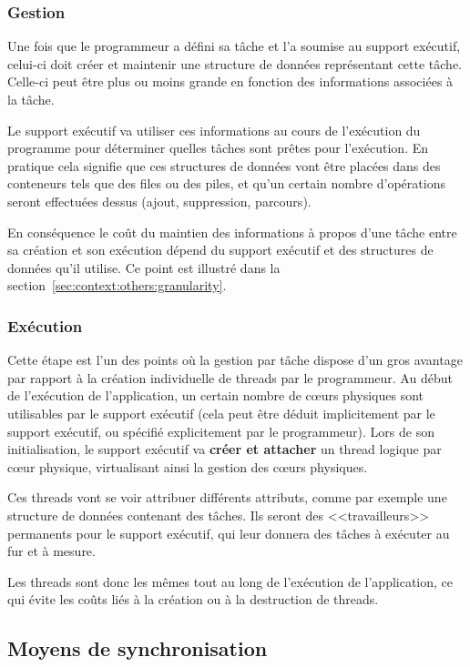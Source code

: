 \subsubsection{Gestion}

Une fois que le programmeur a défini sa tâche et l'a soumise au support exécutif, celui-ci doit créer et maintenir une structure de données représentant cette tâche.
Celle-ci peut être plus ou moins grande en fonction des informations associées à la tâche.

Le support exécutif va utiliser ces informations au cours de l'exécution du programme pour déterminer quelles tâches sont prêtes pour l'exécution.
En pratique cela signifie que ces structures de données vont être placées dans des conteneurs tels que des files ou des piles, et qu'un certain nombre d'opérations seront effectuées dessus (ajout, suppression, parcours).

En conséquence le coût du maintien des informations à propos d'une tâche entre sa création et son exécution dépend du support exécutif et des structures de données qu'il utilise.
Ce point est illustré dans la section~\ref{sec:context:others:granularity}.


\subsubsection{Exécution}

Cette étape est l'un des points où la gestion par tâche dispose d'un gros avantage par rapport à la création individuelle de threads par le programmeur.
Au début de l'exécution de l'application, un certain nombre de cœurs physiques sont utilisables par le support exécutif (cela peut être déduit implicitement par le support exécutif, ou spécifié explicitement par le programmeur).
Lors de son initialisation, le support exécutif va \textbf{créer et attacher} un thread logique par cœur physique, virtualisant ainsi la gestion des cœurs physiques.

Ces threads vont se voir attribuer différents attributs, comme par exemple une structure de données contenant des tâches.
Ils seront des <<travailleurs>> permanents pour le support exécutif, qui leur donnera des tâches à exécuter au fur et à mesure.

Les threads sont donc les mêmes tout au long de l'exécution de l'application, ce qui évite les coûts liés à la création ou à la destruction de threads.


\subsection{Moyens de synchronisation}

